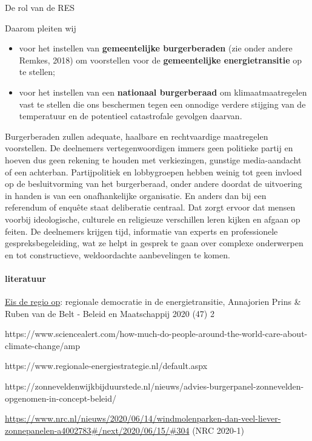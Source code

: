 \begin{voorstel}{De rol van de RES}
\begin{multicols*}{2}
\begin{aanbevelingen}
Daarom pleiten wij
\begin{itemize}
	\item voor het instellen van \textbf{gemeentelijke burgerberaden} (zie onder andere Remkes, 2018) om voorstellen voor de \textbf{gemeentelijke energietransitie} op te stellen;
	\item voor het instellen van een \textbf{nationaal burgerberaad} om klimaatmaatregelen vast te stellen die ons beschermen tegen een onnodige verdere stijging van de temperatuur en de potentieel catastrofale gevolgen daarvan.
\end{itemize}
Burgerberaden zullen adequate, haalbare en rechtvaardige maatregelen voorstellen. De deelnemers vertegenwoordigen immers geen politieke partij en hoeven dus geen rekening te houden met verkiezingen, gunstige media-aandacht of een achterban. Partijpolitiek en lobbygroepen hebben weinig tot geen invloed op de besluitvorming van het burgerberaad, onder andere doordat de uitvoering in handen is van een onafhankelijke organisatie. En anders dan bij een referendum of enquête staat deliberatie centraal. Dat zorgt ervoor dat mensen voorbij ideologische, culturele en religieuze verschillen leren kijken en afgaan op feiten. De deelnemers krijgen tijd, informatie van experts en professionele gespreksbegeleiding, wat ze helpt in gesprek te gaan over complexe onderwerpen en tot constructieve, weldoordachte aanbevelingen te komen.
\end{aanbevelingen}

\paragraph{literatuur}

\href{https://energievoordrenthe.nl/toolkit/volksvertegenwoordigers/HandlerDownloadFiles.ashx?idnv=1688984}{Eis de regio op}: regionale democratie in de energietransitie, Annajorien Prins \& Ruben van de Belt - Beleid en Maatschappij 2020 (47) 2

https://www.sciencealert.com/how-much-do-people-around-the-world-care-about-climate-change/amp

https://www.regionale-energiestrategie.nl/default.aspx

https://zonneveldenwijkbijduurstede.nl/nieuws/advies-burgerpanel-zonnevelden-opgenomen-in-concept-beleid/

\url{https://www.nrc.nl/nieuws/2020/06/14/windmolenparken-dan-veel-liever-zonnepanelen-a4002783#/next/2020/06/15/#304} (NRC 2020-1)


\end{multicols*}
\end{voorstel}
